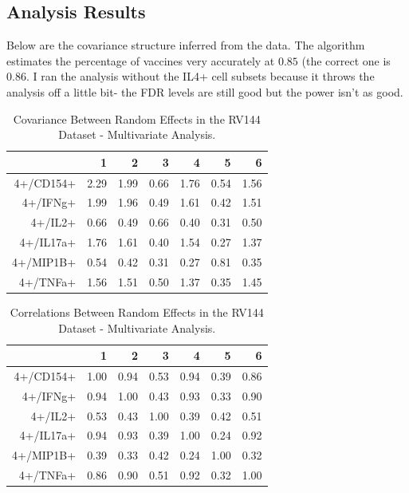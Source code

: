 \documentclass{article}\usepackage[]{graphicx}\usepackage[]{color}
\begin{document}
\subsection{Analysis Results}
Below are the covariance structure inferred from the data. The algorithm estimates the percentage of vaccines very accurately at $0.85$ (the correct one is $0.86$. I ran the analysis without the IL4+ cell subsets because it throws the analysis off a little bit- the FDR levels are still good but the power isn't as good. 

\begin{table}[ht]
\centering
\begin{tabular}{rrrrrrr}
  \hline
 & 1 & 2 & 3 & 4 & 5 & 6 \\ 
  \hline
4+/CD154+ & 2.29 & 1.99 & 0.66 & 1.76 & 0.54 & 1.56 \\ 
  4+/IFNg+ & 1.99 & 1.96 & 0.49 & 1.61 & 0.42 & 1.51 \\ 
  4+/IL2+ & 0.66 & 0.49 & 0.66 & 0.40 & 0.31 & 0.50 \\ 
  4+/IL17a+ & 1.76 & 1.61 & 0.40 & 1.54 & 0.27 & 1.37 \\ 
  4+/MIP1B+ & 0.54 & 0.42 & 0.31 & 0.27 & 0.81 & 0.35 \\ 
  4+/TNFa+ & 1.56 & 1.51 & 0.50 & 1.37 & 0.35 & 1.45 \\ 
   \hline
\end{tabular}
\caption{Covariance Between Random Effects in the RV144 Dataset - Multivariate Analysis.}
\label{multiCovTable}
\end{table}

\begin{table}[ht]
\centering
\begin{tabular}{rrrrrrr}
  \hline
 & 1 & 2 & 3 & 4 & 5 & 6 \\ 
  \hline
4+/CD154+ & 1.00 & 0.94 & 0.53 & 0.94 & 0.39 & 0.86 \\ 
  4+/IFNg+ & 0.94 & 1.00 & 0.43 & 0.93 & 0.33 & 0.90 \\ 
  4+/IL2+ & 0.53 & 0.43 & 1.00 & 0.39 & 0.42 & 0.51 \\ 
  4+/IL17a+ & 0.94 & 0.93 & 0.39 & 1.00 & 0.24 & 0.92 \\ 
  4+/MIP1B+ & 0.39 & 0.33 & 0.42 & 0.24 & 1.00 & 0.32 \\ 
  4+/TNFa+ & 0.86 & 0.90 & 0.51 & 0.92 & 0.32 & 1.00 \\ 
   \hline
\end{tabular}
\caption{Correlations Between Random Effects in the RV144 Dataset - Multivariate Analysis.}
\label{multiCorTable}
\end{table}
\end{document}
